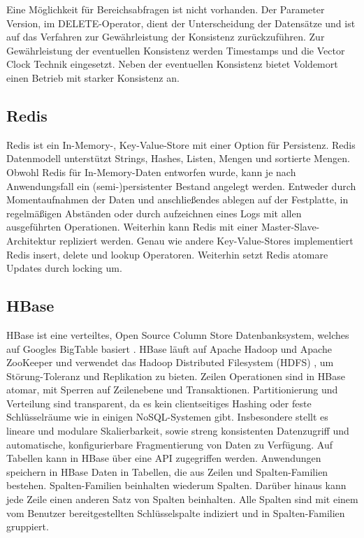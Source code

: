 Eine Möglichkeit für Bereichsabfragen ist nicht vorhanden. Der Parameter Version, im DELETE-Operator, dient der Unterscheidung der Datensätze und ist auf das Verfahren zur Gewährleistung der Konsistenz zurückzuführen. Zur Gewährleistung der eventuellen Konsistenz werden Timestamps und die Vector Clock Technik eingesetzt. Neben der eventuellen Konsistenz bietet Voldemort einen Betrieb mit starker Konsistenz an.       

\subsection{Redis}
\label{ch:AnalyseDatenbanken:sec:Datenbanken:subsec:Redis}

Redis \cite{red2013} ist ein In-Memory-, Key-Value-Store mit einer Option für Persistenz. Redis Datenmodell unterstützt Strings, Hashes, Listen, Mengen und sortierte Mengen. Obwohl Redis für In-Memory-Daten entworfen wurde, kann je nach Anwendungsfall ein (semi-)persistenter Bestand angelegt werden. Entweder durch Momentaufnahmen der Daten und anschließendes ablegen auf der Festplatte, in regelmäßigen Abständen oder durch aufzeichnen eines Logs mit allen ausgeführten Operationen. Weiterhin kann Redis mit einer Master-Slave-Architektur repliziert werden. Genau wie andere Key-Value-Stores implementiert Redis insert, delete und lookup Operatoren. Weiterhin setzt Redis atomare Updates durch locking um. 

\subsection{HBase} 
\label{ch:AnalyseDatenbanken:sec:Datenbanken:subsec:HBase}

HBase ist eine verteiltes, Open Source Column Store Datenbanksystem, welches auf Googles BigTable basiert \cite{Chang:2006:BDS:1267308.1267323}. HBase läuft auf Apache Hadoop und Apache ZooKeeper  \cite{Hunt:2010:ZWC:1855840.1855851} und verwendet das Hadoop Distributed Filesystem (HDFS) \cite{Shvachko:2010:HDF:1913798.1914427}, um Störung-Toleranz und Replikation zu bieten. Zeilen Operationen sind in HBase atomar, mit Sperren auf Zeilenebene und Transaktionen. Partitionierung und Verteilung sind transparent, da es kein clientseitiges Hashing oder feste Schlüsselräume wie in einigen NoSQL-Systemen gibt. 
Insbesondere stellt es lineare und modulare Skalierbarkeit, sowie streng konsistenten Datenzugriff und automatische, konfigurierbare Fragmentierung von Daten zu Verfügung. Auf Tabellen kann in HBase über eine API zugegriffen werden. Anwendungen speichern in HBase Daten in Tabellen, die aus Zeilen und Spalten-Familien bestehen. Spalten-Familien beinhalten wiederum Spalten. Darüber hinaus kann jede Zeile einen anderen Satz von Spalten beinhalten. Alle Spalten sind mit einem vom Benutzer bereitgestellten Schlüsselspalte indiziert und in Spalten-Familien gruppiert.

